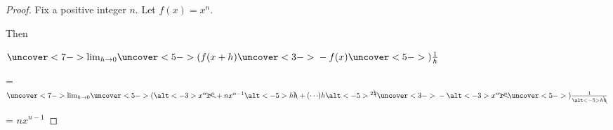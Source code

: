 \documentclass[17pt]{beamer}
\theoremstyle{remark}
\begin{document}



\begin{frame}
\begin{proof}
Fix a positive integer $n$.
Let $f(x) = x^n$.

\bigskip\pause
Then \par\bigskip
\phantom{=}
$\uncover<7->{\lim_{h\to0}}
	\uncover<5->(
	f(x+h) \uncover<3->{{}- f(x)}
	\uncover<5->{)\tfrac1h}$

\bigskip
= $\uncover<7->{\lim_{h\to0}}
	\uncover<5->(
	\alt<-3>{x^n}{\bcancel{x^n}}
	+ nx^{n-1}\alt<-5>h{\bcancel h}
	+ (\cdots\hspace{-0.1ex})h\alt<-5>{^2}{^{\bcancel2}}
	\uncover<3->{{}-\alt<-3>{x^n}{\bcancel{x^n}}}
	\uncover<5->{)\tfrac1{\alt<-5>h{\bcancel h}}}$

\bigskip\pause[8]
= $nx^{n-1}$
\end{proof}
\end{frame}
\end{document}
